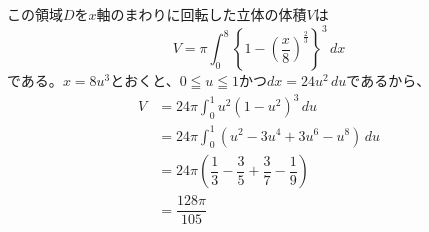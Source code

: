 この領域$D$を$x$軸のまわりに回転した立体の体積$V$は
\[
V
=\pi\int_0^8
\left\{1-\left(\dfrac{x}{8}\right)^{\frac{2}{3}}\right\}^{3}
\,dx
\]
である。$x=8u^3$とおくと、$0\leqq u\leqq1$かつ$dx=24u^2\,du$であるから、
\[
\begin{aligned}
V
&=24\pi\int_0^1u^2(1-u^2)^3\,du\\
&=24\pi\int_0^1
\left(u^2-3u^4+3u^6-u^8\right)\,du\\
&=24\pi
\left(\dfrac{1}{3}-\dfrac{3}{5}+\dfrac{3}{7}-\dfrac{1}{9}\right)\\
&=\dfrac{128\pi}{105}
\end{aligned}
\]
